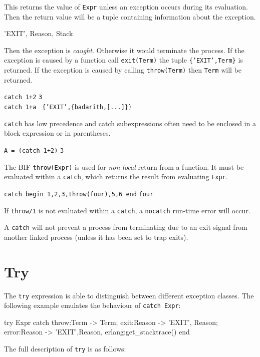 This returns the value of \texttt{Expr} unless an exception occurs
during its evaluation. Then the return value will be a tuple
containing information about the exception.

\begin{erlang}
{'EXIT', {Reason, Stack}}
\end{erlang}

Then the exception is \emph{caught}. Otherwise it would terminate
the process. If the exception is caused by a function call
\texttt{exit(Term)} the tuple \texttt{\{'EXIT',Term\}} is returned. If
the exception is caused by calling \texttt{throw(Term)} then
\texttt{Term} will be returned.

\texttt{catch 1+2} \resultingin \texttt{3}\\
\texttt{catch 1+a } \resultingin \texttt{\{'EXIT',\{badarith,[...]\}\}}

\texttt{catch} has low precedence and catch subexpressions often need
to be enclosed in a block expression or in parentheses.

\texttt{A = (catch 1+2)} \resultingin \texttt{3}

The BIF \texttt{throw(Expr)} is used for \emph{non-local} return
from a function. It must be evaluated within a \texttt{catch}, which returns
the result from evaluating \texttt{Expr}.

\texttt{catch begin 1,2,3,throw(four),5,6 end} \resultingin \texttt{four}

If \texttt{throw/1} is not evaluated within a \texttt{catch}, a
\texttt{nocatch} run-time error will occur.

A \texttt{catch} will not prevent a process from terminating due to an exit
signal from another linked process (unless it has been set to trap
exits).


\section{Try}
\label{errorhandling:try}
The \texttt{try} expression is able to distinguish between different exception
classes.  The following example emulates the behaviour of \texttt{catch Expr}:

\begin{erlang}
try Expr
catch
    throw:Term -> Term;
    exit:Reason -> {'EXIT', Reason};
    error:Reason -> {'EXIT',{Reason, erlang:get_stacktrace()}}
end
\end{erlang}

The full description of \texttt{try} is as follows:


